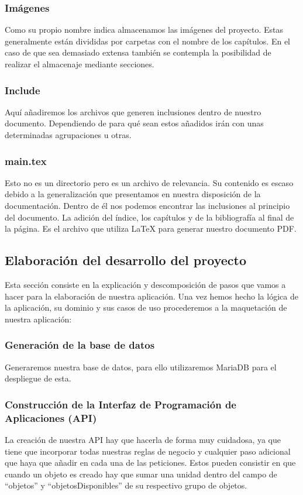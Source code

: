 \subsubsection{Imágenes}
Como su propio nombre indica almacenamos las imágenes del proyecto. Estas generalmente están divididas por carpetas con el nombre de los capítulos. En el caso de que sea demasiado extensa también se contempla la posibilidad de realizar el almacenaje mediante secciones.

\subsubsection{Include}
Aquí añadiremos los archivos que generen inclusiones dentro de nuestro documento. Dependiendo de para qué sean estos añadidos irán con unas determinadas agrupaciones u otras.

\subsubsection{main.tex}
Esto no es un directorio pero es un archivo de relevancia. Su contenido es escaso debido a la generalización que presentamos en nuestra disposición de la documentación. Dentro de él nos podemos encontrar las inclusiones al principio del documento. La adición del índice, los capítulos y de la bibliografía al final de la página. Es el archivo que utiliza LaTeX para generar nuestro documento PDF.


\subsection{Elaboración del desarrollo del proyecto}

Esta sección consiste en la explicación y descomposición de pasos que vamos a hacer para la elaboración de nuestra aplicación. Una vez hemos hecho la lógica de la aplicación, su dominio y sus casos de uso procederemos a la maquetación de nuestra aplicación:

\subsubsection{Generación de la base de datos}

Generaremos nuestra base de datos, para ello utilizaremos MariaDB para el despliegue de esta. 

\subsubsection{Construcción de la Interfaz de Programación de Aplicaciones (API)}
La creación de nuestra API hay que hacerla de forma muy cuidadosa, ya que tiene que incorporar todas nuestras reglas de negocio y cualquier paso adicional que haya que añadir en cada una de las peticiones. Estos pueden consistir en que cuando un objeto es creado hay que sumar una unidad dentro del campo de ``objetos'' y ``objetosDisponibles'' de su respectivo grupo de objetos.

